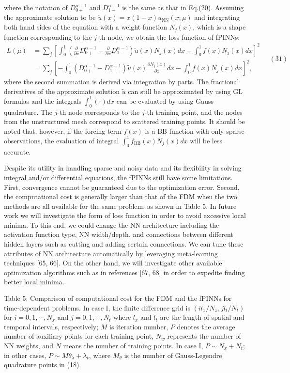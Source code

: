 \documentclass[UTF8]{article}
\begin{document}
where the notation of $D_{0+}^{\alpha-1}$ and $D_{1-}^{\alpha-1}$ is the same as that in Eq.(20). Assuming the approximate solution to be $\tilde{u}(x) = x(1-x)u_{\text{NN}}(x; \mu)$ and integrating both hand sides of the equation with a weight function $N_j(x)$, which is a shape function corresponding to the $j$-th node, we obtain the loss function of fPINNs:
$$
\begin{aligned}
L(\mu) &= \sum_j \left[ \int_0^1 \left( \frac{\partial}{\partial x} D_{0+}^{\alpha-1} - \frac{\partial}{\partial x} D_{1-}^{\alpha-1} \right) \tilde{u}(x) N_j(x) dx - \int_0^1 f(x) N_j(x) dx \right]^2 \\
&= \sum_j \left[ - \int_0^1 (D_{0+}^{\alpha-1} - D_{1-}^{\alpha-1}) \tilde{u}(x) \frac{\partial N_j(x)}{\partial x} dx - \int_0^1 f(x) N_j(x) dx \right]^2,
\end{aligned} \quad (31)
$$
where the second summation is derived via integration by parts. The fractional derivatives of the approximate solution $\tilde{u}$ can still be approximated by using GL formulas and the integrals $\int_0^1 (\cdot) dx$ can be evaluated by using Gauss quadrature. The $j$-th node corresponds to the $j$-th training point, and the nodes from the unstructured mesh correspond to scattered training points. It should be noted that, however, if the forcing term $f(x)$ is a BB function with only sparse observations, the evaluation of integral $\int_0^1 f_{\text{BB}}(x) N_j(x) dx$ will be less accurate.

Despite its utility in handling sparse and noisy data and its flexibility in solving integral and/or differential equations, the fPINNs still have some limitations. First, convergence cannot be guaranteed due to the optimization error. Second, the computational cost is generally larger than that of the FDM when the two methods are all available for the same problem, as shown in Table 5. In future work we will investigate the form of loss function in order to avoid excessive local minima. To this end, we could change the NN architecture including the activation function type, NN width/depth, and connections between different hidden layers such as cutting and adding certain connections. We can tune these attributes of NN architecture automatically by leveraging meta-learning techniques [65, 66]. On the other hand, we will investigate other available optimization algorithms such as in references [67, 68] in order to expedite finding better local minima.

Table 5: Comparison of computational cost for the FDM and the fPINNs for time-dependent problems. In case I, the finite difference grid is $(il_x/N_x, j l_t/N_t)$ for $i = 0, 1, \cdots, N_x$ and $j = 0, 1, \cdots, N_t$ where $l_x$ and $l_t$ are the length of spatial and temporal intervals, respectively; $M$ is iteration number, $P$ denotes the average number of auxiliary points for each training point, $N_w$ represents the number of NN weights, and $N$ means the number of training points. In case I, $P \sim N_x + N_t$; in other cases, $P \sim M\theta_\lambda + \lambda_t$, where $M_\theta$ is the number of Gauss-Legendre quadrature points in (18).
\end{document}
